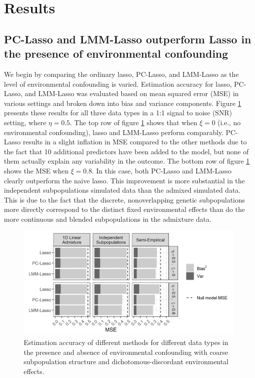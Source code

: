 \section{Results} \label{sec:results}

\subsection{PC-Lasso and LMM-Lasso outperform Lasso in the presence of environmental confounding}

We begin by comparing the ordinary lasso, PC-Lasso, and LMM-Lasso as the level of environmental confounding is varied. Estimation accuracy for lasso, PC-Lasso, and LMM-Lasso was evaluated based on mean squared error (MSE) in various settings and broken down into bias and variance components.  Figure \ref{fig:mse} presents these results for all three data types in a 1:1 signal to noise (SNR) setting, where $\eta = 0.5$. The top row of figure \ref{fig:mse} shows that when $\xi = 0$ (i.e., no environmental confounding), lasso and LMM-Lasso perform comparably. PC-Lasso results in a slight inflation in MSE compared to the other methods due to the fact that 10 additional predictors have been added to the model, but none of them actually explain any variability in the outcome. The bottom row of figure \ref{fig:mse} shows the MSE when $\xi = 0.8$. In this case, both PC-Lasso and LMM-Lasso clearly outperform the naive lasso. This improvement is more substantial in the independent subpopulations simulated data than the admixed simulated data. This is due to the fact that the discrete, nonoverlapping genetic subpopulations more directly correspond to the distinct fixed environmental effects than do the more continuous and blended subpopulations in the admixture data.

\begin{figure}[H]
    \centering
    \includegraphics[scale = 1.1]{figures/beta_mse.png}
    \caption{Estimation accuracy of different methods for different data types in the presence and absence of environmental confounding with coarse subpopulation structure and dichotomous-discordant environmental effects.}
    \label{fig:mse}
\end{figure}

